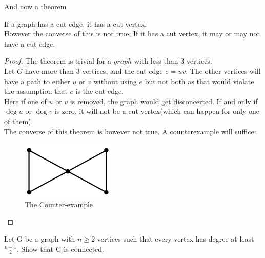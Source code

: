 And now a theorem
\begin{theorem}
    If a graph has a cut edge, it has a cut vertex.\\
    However the converse of this is not true. If it has a cut vertex, it may or may not have a cut edge.
\end{theorem}
\begin{proof}
    The theorem is trivial for a $graph$ with less than $3$ vertices.\\
    Let $G$ have more than 3 vertices, and the cut edge $e=uv$. The other vertices will have a path to either $u$ or $v$ without using $e$ but not both as that would violate the assumption that $e$ is the cut edge.\\
    Here if one of $u$ or $v$ is removed, the graph would get disconcerted. If and only if $\deg u$ or $\deg v$ is zero, it will not be a cut vertex(which can happen for only one of them).\\
    The converse of this theorem is however not true. A counterexample will suffice:
    \begin{figure}[h]
        \centering
        \includegraphics[width=0.5\linewidth]{Photos/counterexample.png}
        \caption{The Counter-example}
    \end{figure}
\end{proof}
\begin{example}
    Let G be a graph with $n \geq 2$ vertices such that every vertex has degree at least $\frac{n-1}{2}$. Show that G is connected.
\end{example}
